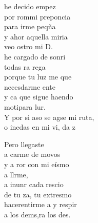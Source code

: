 \begin{cancion}
	he decido empez \\
	por rommi preponcia \\
	para irme peqña\\
	y ahor aquella miria\\
	veo ostro mi D. \\
	\jump
	 he cargado de sonri \\
	todas ra rega \\
	porque tu luz me que \\
	necesdarme ente \\
	y ca que sigue haendo \\
	motipara lur. \\
	\jump
	Y por si aso se agse mi ruta,\\
	o incdas en mi vi, da z \jump\\
	\begin{chorus}%
		Pero llegaste  \\
		a carme de movos\\
		y a ror con mi eísmo\\
		a llrme, \\
		a inunr cada rescio\\
		de tu za, tu extresmo \\
		hacerentirme a y respir \\
		a los dems,ra los des.\jump\\
	\end{chorus}%
	\jump
\end{cancion}%
